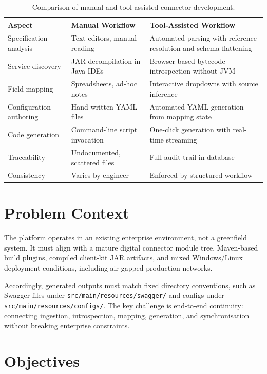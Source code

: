 \begin{table}[H]
\centering
\caption{Comparison of manual and tool-assisted connector development.}
\label{tab:manual_vs_automated}
\small
\begin{tabular}{|p{3.2cm}|p{4.5cm}|p{4.5cm}|}
\hline
\textbf{Aspect} & \textbf{Manual Workflow} & \textbf{Tool-Assisted Workflow} \\
\hline
Specification analysis & Text editors, manual reading & Automated parsing with reference resolution and schema flattening \\
\hline
Service discovery & JAR decompilation in Java IDEs & Browser-based bytecode introspection without JVM \\
\hline
Field mapping & Spreadsheets, ad-hoc notes & Interactive dropdowns with source inference \\
\hline
Configuration authoring & Hand-written YAML files & Automated YAML generation from mapping state \\
\hline
Code generation & Command-line script invocation & One-click generation with real-time streaming \\
\hline
Traceability & Undocumented, scattered files & Full audit trail in database \\
\hline
Consistency & Varies by engineer & Enforced by structured workflow \\
\hline
\end{tabular}
\end{table}

\section{Problem Context}

The platform operates in an existing enterprise environment, not a greenfield system. It must align with a mature digital connector module tree, Maven-based build plugins, compiled client-kit JAR artifacts, and mixed Windows/Linux deployment conditions, including air-gapped production networks.

Accordingly, generated outputs must match fixed directory conventions, such as Swagger files under \texttt{src/\allowbreak main/\allowbreak resources/\allowbreak swagger/} and configs under \texttt{src/\allowbreak main/\allowbreak resources/\allowbreak configs/}. The key challenge is end-to-end continuity: connecting ingestion, introspection, mapping, generation, and synchronisation without breaking enterprise constraints.

\section{Objectives}

